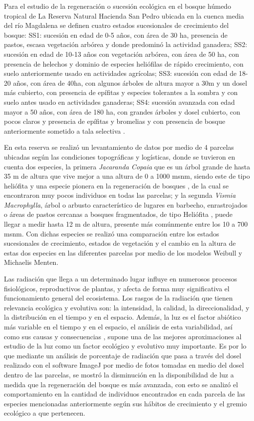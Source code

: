 \documentclass[letterpaper,9pt,onecolumn,twoside,]{pinp}
\begin{document}
Para el estudio de la regeneración o sucesión ecológica en el bosque
húmedo tropical de La Reserva Natural Hacienda San Pedro ubicada en
la cuenca media del río Magdalena se definen cuatro estados sucesionales
de crecimiento del bosque: SS1: sucesión en edad de 0-5 años, con área
de 30 ha, presencia de pastos, escasa vegetación arbórea y donde
predominó la actividad ganadera; SS2: sucesión en edad de 10-13 años con
vegetación arbórea, con área de 50 ha, con presencia de helechos y
dominio de especies heliófilas de rápido crecimiento, con suelo
anteriormente usado en actividades agrícolas; SS3: sucesión con edad de
18-20 años, con área de 40ha, con algunos árboles de altura mayor a 30m
y un dosel más cubierto, con presencia de epífitas y especies tolerantes
a la sombra y con suelo antes usado en actividades ganaderas; SS4:
sucesión avanzada con edad mayor a 50 años, con área de 180 ha, con
grandes árboles y dosel cubierto, con pocos claros y presencia de
epífitas y bromelias y con presencia de bosque anteriormente sometido a
tala selectiva \citep{sala}.

En esta reserva se realizó un levantamiento de datos por medio de 4
parcelas ubicadas según las condiciones topográficas y logísticas, donde
se tuvieron en cuenta dos especies, la primera \emph{Jacaranda Copaia}
que es un árbol grande de hasta 35 m de altura que vive mejor a una
altura de 0 a 1000 msnm, siendo este de tipo heliófita y una especie
pionera en la regeneración de bosques \citep{tapia}, de la cual se
encontraron muy pocos individuos en todas las parcelas; y la segunda
\emph{Vismia Macrophylla}, árbol o arbusto característico de lugares en
barbecho, enrastrojados o áreas de pastos cercanas a bosques
fragmentados, de tipo Heliófita \citep{leza}, puede llegar a medir hasta
12 m de altura, presente más comúnmente entre los 10 a 700
msnm\citep{vismia}. Con dichas especies se realizó una comparación entre
los estados sucesionales de crecimiento, estados de vegetación y el cambio en la altura de
estas dos especies en las diferentes parcelas por medio de los modelos
Weibull y Michaelis Menten.

Las radiación que llega a un determinado lugar influye en numerosos
procesos fisiológicos, reproductivos de plantas, y afecta de forma muy
significativa el funcionamiento general del ecosistema. Los rasgos de la
radiación que tienen relevancia ecológica y evolutiva son: la
intensidad, la calidad, la direccionalidad, y la distribución en el
tiempo y en el espacio. Además, la luz es el factor abiótico más
variable en el tiempo y en el espacio, el análisis de esta variabilidad,
así como sus causas y consecuencias , supone una de las mejores
aproximaciones al estudio de la luz como un factor ecológico y evolutivo
muy importante. \citep{vallares} Es por lo que mediante un análisis de
porcentaje de radiación que pasa a través del dosel realizado con el
software ImageJ por medio de fotos tomadas en medio del dosel dentro de
las parcelas, se mostró la disminución en la disponibilidad
de luz a medida que la regeneración del bosque es más avanzada, con
esto se analizó el comportamiento en la cantidad de individuos encontrados
en cada parcela de las especies mencionadas anteriormente según sus
hábitos de crecimiento y el gremio ecológico a que pertenecen.
\end{document}
